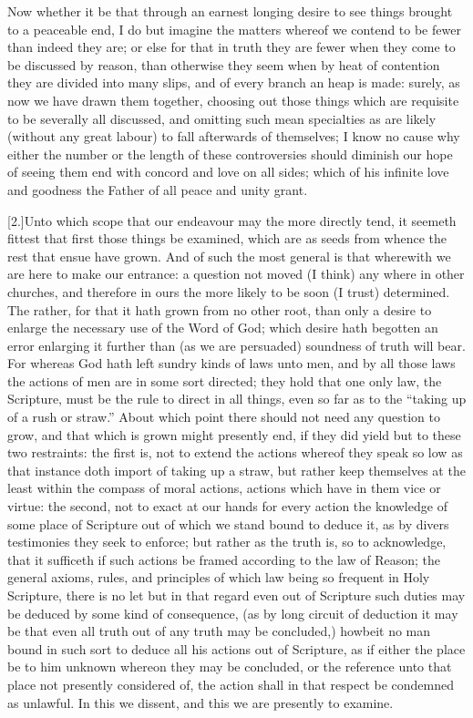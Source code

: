 Now whether it be that through an earnest longing desire to see things brought to a peaceable end, I do but imagine the matters whereof we contend to be fewer than indeed they are; or else for that in truth they are fewer when they come to be discussed by reason, than otherwise they seem when by heat of contention they are divided into many slips, and of every branch an heap is made: surely, as now we have drawn them together, choosing out those things which are requisite to be severally all discussed, and omitting such mean specialties as are likely (without any great labour) to fall afterwards of themselves; I know no cause why either the number or the length of these controversies should diminish our hope of seeing them end with concord and love on all sides; which of his infinite love and goodness the Father of all peace and unity grant.

[2.]Unto which scope that our endeavour may the more directly tend, it seemeth fittest that first those things be examined, which are as seeds from whence the rest that ensue have grown. And of such the most general is that wherewith we are here to make our entrance: a question not moved (I think) any where in other churches, and therefore in ours the more likely to be soon (I trust) determined. The rather, for that it hath grown from no other root, than only a desire to enlarge the necessary use of the Word of God; which desire hath begotten an error enlarging it further than (as we are persuaded) soundness of truth will bear. For whereas God hath left sundry kinds of laws unto men, and by all those laws the actions of men are in some sort directed; they hold that one only law, the Scripture, must be the rule to direct in all things, even so far as to the “taking up of a rush or straw.” About which point there should not need any  question to grow, and that which is grown might presently end, if they did yield but to these two restraints: the first is, not to extend the actions whereof they speak so low as that instance doth import of taking up a straw, but rather keep themselves at the least within the compass of moral actions, actions which have in them vice or virtue: the second, not to exact at our hands for every action the knowledge of some place of Scripture out of which we stand bound to deduce it, as by divers testimonies they seek to enforce; but rather as the truth is, so to acknowledge, that it sufficeth if such actions be framed according to the law of Reason; the general axioms, rules, and principles of which law being so frequent in Holy Scripture, there is no let but in that regard even out of Scripture such duties may be deduced by some kind of consequence, (as by long circuit of deduction it may be that even all truth out of any truth may be concluded,) howbeit no man bound in such sort to deduce all his actions out of Scripture, as if either the place be to him unknown whereon they may be concluded, or the reference unto that place not presently considered of, the action shall in that respect be condemned as unlawful. In this we dissent, and this we are presently to examine.

